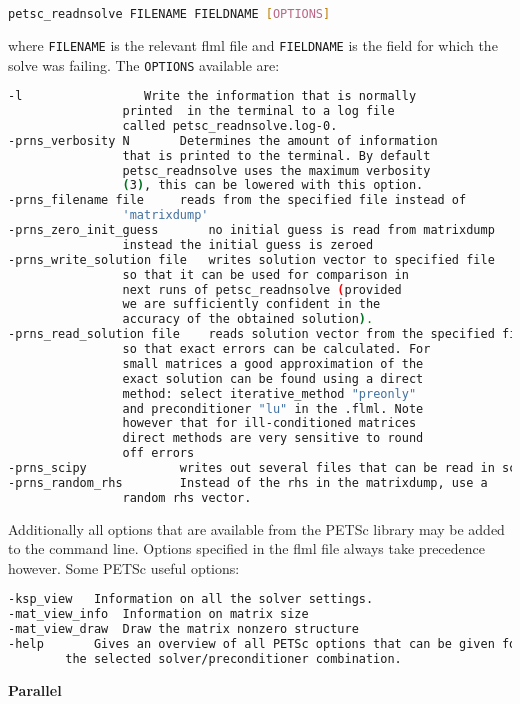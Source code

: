 \begin{lstlisting}[language = Bash]
petsc_readnsolve FILENAME FIELDNAME [OPTIONS]
\end{lstlisting}
where \lstinline[language = Bash]+FILENAME+ is the relevant flml file and \lstinline[language = Bash]+FIELDNAME+ is the field for which the solve was failing. The \lstinline[language = Bash]+OPTIONS+ available are:
\begin{lstlisting}[language = Bash]
 -l 	 			Write the information that is normally
				printed  in the terminal to a log file 
				called petsc_readnsolve.log-0.
-prns_verbosity N 	 	Determines the amount of information 
				that is printed to the terminal. By default 
				petsc_readnsolve uses the maximum verbosity 
				(3), this can be lowered with this option. 
-prns_filename file		reads from the specified file instead of 
				'matrixdump'
-prns_zero_init_guess 		no initial guess is read from matrixdump 
				instead the initial guess is zeroed
-prns_write_solution file 	writes solution vector to specified file 
				so that it can be used for comparison in 
				next runs of petsc_readnsolve (provided 
				we are sufficiently confident in the 
				accuracy of the obtained solution).
-prns_read_solution file 	reads solution vector from the specified file,
				so that exact errors can be calculated. For 
				small matrices a good approximation of the  
				exact solution can be found using a direct 
				method: select iterative_method "preonly" 
				and preconditioner "lu" in the .flml. Note 
				however that for ill-conditioned matrices 
				direct methods are very sensitive to round 
				off errors
-prns_scipy 			writes out several files that can be read in scipy.
-prns_random_rhs 	 	Instead of the rhs in the matrixdump, use a 
				random rhs vector.
\end{lstlisting} 

Additionally all options that are available from the PETSc library may be added to the command line. Options specified in the flml file always take precedence however. Some PETSc useful options:

\begin{lstlisting}[language = Bash]
-ksp_view 	Information on all the solver settings.
-mat_view_info 	Information on matrix size
-mat_view_draw 	Draw the matrix nonzero structure
-help 		Gives an overview of all PETSc options that can be given for 
		the selected solver/preconditioner combination. 
\end{lstlisting} 

{\bf Parallel}


